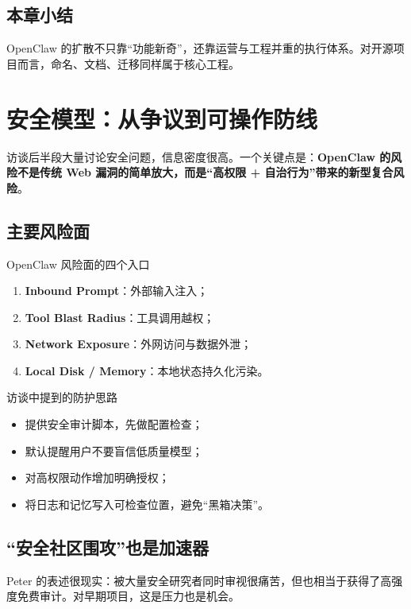 \documentclass[a4paper]{article}
\begin{document}
\subsection{本章小结}
OpenClaw 的扩散不只靠“功能新奇”，还靠运营与工程并重的执行体系。对开源项目而言，命名、文档、迁移同样属于核心工程。

\section{安全模型：从争议到可操作防线}

访谈后半段大量讨论安全问题，信息密度很高。一个关键点是：\textbf{OpenClaw 的风险不是传统 Web 漏洞的简单放大，而是“高权限 + 自治行为”带来的新型复合风险}。

\subsection{主要风险面}

\begin{warningbox}{OpenClaw 风险面的四个入口}
\begin{enumerate}
    \item \textbf{Inbound Prompt}：外部输入注入；
    \item \textbf{Tool Blast Radius}：工具调用越权；
    \item \textbf{Network Exposure}：外网访问与数据外泄；
    \item \textbf{Local Disk / Memory}：本地状态持久化污染。
\end{enumerate}
\end{warningbox}

\begin{importantbox}{访谈中提到的防护思路}
\begin{itemize}
    \item 提供安全审计脚本，先做配置检查；
    \item 默认提醒用户不要盲信低质量模型；
    \item 对高权限动作增加明确授权；
    \item 将日志和记忆写入可检查位置，避免“黑箱决策”。
\end{itemize}
\end{importantbox}

\subsection{“安全社区围攻”也是加速器}

Peter 的表述很现实：被大量安全研究者同时审视很痛苦，但也相当于获得了高强度免费审计。对早期项目，这是压力也是机会。
\end{document}
